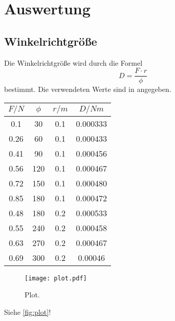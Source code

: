 \section{Auswertung}
\label{sec:Auswertung}
\subsection{Winkelrichtgröße}
Die Winkelrichtgröße wird durch die Formel
\begin{equation}
  D = \frac{F \cdot r}{\phi}
\end{equation}
bestimmt. Die verwendeten Werte sind in angegeben.
\begin{table}
  \centering
  \label{tab:winkelrichtgr}
  \begin{tabular}{c c c c}
    \toprule
    $F/N$ & $\phi$ & $r/m$ & $D/Nm$ \\
    \midrule
    0.1  &  30 & 0.1 & 0.000333\\
    0.26 &  60 & 0.1 & 0.000433\\
    0.41 &  90 & 0.1 & 0.000456\\
    0.56 & 120 & 0.1 & 0.000467\\
    0.72 & 150 & 0.1 & 0.000480\\
    0.85 & 180 & 0.1 & 0.000472\\
    0.48 & 180 & 0.2 & 0.000533\\
    0.55 & 240 & 0.2 & 0.000458\\
    0.63 & 270 & 0.2 & 0.000467\\
    0.69 & 300 & 0.2 & 0.00046\\
    \bottomrule
  \end{tabular}

\end{table}

\begin{figure}
  \centering
  \texttt{[image: plot.pdf]}
  \caption{Plot.}
  \label{fig:plot}
\end{figure}


Siehe \autoref{fig:plot}!
